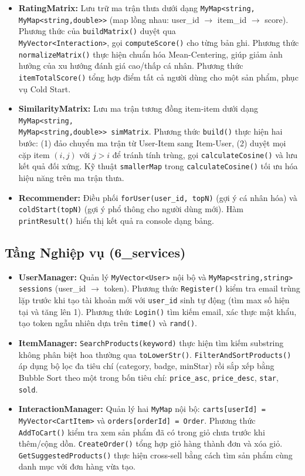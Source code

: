 \documentclass{report}
\begin{document}
\begin{itemize}
    \item \textbf{RatingMatrix:} Lưu trữ ma trận thưa dưới dạng \texttt{MyMap<string, MyMap<string,double>>} (map lồng nhau: user\_id $\longrightarrow$ item\_id $\longrightarrow$ score). Phương thức của \texttt{buildMatrix()} duyệt qua \\ \texttt{MyVector<Interaction>}, gọi \texttt{computeScore()} cho từng bản ghi. Phương thức \texttt{normalizeMatrix()} thực hiện chuẩn hóa Mean-Centering, giúp giảm ảnh hưởng của xu hướng đánh giá cao/thấp cá nhân. Phương thức \texttt{itemTotalScore()} tổng hợp điểm tất cả người dùng cho một sản phẩm, phục vụ Cold Start.
    \item \textbf{SimilarityMatrix:} Lưu ma trận tương đồng item-item dưới dạng \texttt{MyMap<string, \\ MyMap<string,double>> simMatrix}. Phương thức \texttt{build()} thực hiện hai bước: (1) đảo chuyển ma trận từ User-Item sang Item-User, (2) duyệt mọi cặp item $(i,j)$ với $j > i$ để tránh tính trùng, gọi \texttt{calculateCosine()} và lưu kết quả đối xứng. Kỹ thuật \texttt{smallerMap} trong \texttt{calculateCosine()} tối ưu hóa hiệu năng trên ma trận thưa.
    \item \textbf{Recommender:} Điều phối \texttt{forUser(user\_id, topN)} (gợi ý cá nhân hóa) và \texttt{coldStart(topN)} (gợi ý phổ thông cho người dùng mới). Hàm \texttt{printResult()} hiển thị kết quả ra console dạng bảng.
\end{itemize}

\subsection{Tầng Nghiệp vụ (6\_services)}

\begin{itemize}
    \item \textbf{UserManager:} Quản lý \texttt{MyVector<User>} nội bộ và \texttt{MyMap<string,string> sessions} (user\_id $\to$ token). Phương thức \texttt{Register()} kiểm tra email trùng lặp trước khi tạo tài khoản mới với \texttt{user\_id} sinh tự động (tìm max số hiện tại và tăng lên 1). Phương thức \texttt{Login()} tìm kiếm email, xác thực mật khẩu, tạo token ngẫu nhiên dựa trên \texttt{time()} và \texttt{rand()}.
    \item \textbf{ItemManager:} \texttt{SearchProducts(keyword)} thực hiện tìm kiếm substring không phân biệt hoa thường qua \texttt{toLowerStr()}. \texttt{FilterAndSortProducts()} áp dụng bộ lọc đa tiêu chí (category, badge, minStar) rồi sắp xếp bằng Bubble Sort theo một trong bốn tiêu chí: \texttt{price\_asc}, \texttt{price\_desc}, \texttt{star}, \texttt{sold}.
    \item \textbf{InteractionManager:} Quản lý hai \texttt{MyMap} nội bộ: \texttt{carts[userId] = MyVector<CartItem>} và \texttt{orders[orderId] = Order}. Phương thức \texttt{AddToCart()} kiểm tra xem sản phẩm đã có trong giỏ chưa trước khi thêm/cộng dồn. \texttt{CreateOrder()} tổng hợp giỏ hàng thành đơn và xóa giỏ. \\ \texttt{GetSuggestedProducts()} thực hiện cross-sell bằng cách tìm sản phẩm cùng danh mục với đơn hàng vừa tạo.
\end{itemize}
\end{document}
